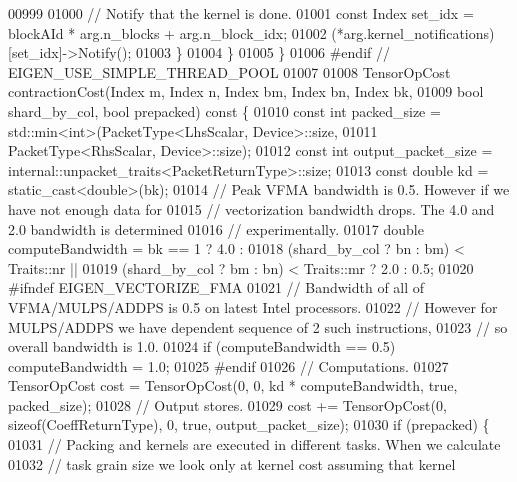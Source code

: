 \begin{DoxyCode}
{00999 
01000         \textcolor{comment}{// Notify that the kernel is done.}
01001         \textcolor{keyword}{const} Index set\_idx = blockAId * arg.n\_blocks + arg.n\_block\_idx;
01002         (*arg.kernel\_notifications)[set\_idx]->Notify();
01003       \}
01004     \}
01005   \}
01006 \textcolor{preprocessor}{#endif  // EIGEN\_USE\_SIMPLE\_THREAD\_POOL}
01007 
01008   TensorOpCost contractionCost(Index m, Index n, Index bm, Index bn, Index bk,
01009                                \textcolor{keywordtype}{bool} shard\_by\_col, \textcolor{keywordtype}{bool} prepacked)\textcolor{keyword}{ const }\{
01010     \textcolor{keyword}{const} \textcolor{keywordtype}{int} packed\_size = std::min<int>(PacketType<LhsScalar, Device>::size,
01011                                           PacketType<RhsScalar, Device>::size);
01012     \textcolor{keyword}{const} \textcolor{keywordtype}{int} output\_packet\_size = internal::unpacket\_traits<PacketReturnType>::size;
01013     \textcolor{keyword}{const} \textcolor{keywordtype}{double} kd = \textcolor{keyword}{static\_cast<}\textcolor{keywordtype}{double}\textcolor{keyword}{>}(bk);
01014     \textcolor{comment}{// Peak VFMA bandwidth is 0.5. However if we have not enough data for}
01015     \textcolor{comment}{// vectorization bandwidth drops. The 4.0 and 2.0 bandwidth is determined}
01016     \textcolor{comment}{// experimentally.}
01017     \textcolor{keywordtype}{double} computeBandwidth = bk == 1 ? 4.0 :
01018           (shard\_by\_col ? bn : bm) < Traits::nr ||
01019           (shard\_by\_col ? bm : bn) < Traits::mr ? 2.0 : 0.5;
01020 \textcolor{preprocessor}{#ifndef EIGEN\_VECTORIZE\_FMA}
01021     \textcolor{comment}{// Bandwidth of all of VFMA/MULPS/ADDPS is 0.5 on latest Intel processors.}
01022     \textcolor{comment}{// However for MULPS/ADDPS we have dependent sequence of 2 such instructions,}
01023     \textcolor{comment}{// so overall bandwidth is 1.0.}
01024     \textcolor{keywordflow}{if} (computeBandwidth == 0.5) computeBandwidth = 1.0;
01025 \textcolor{preprocessor}{#endif}
01026     \textcolor{comment}{// Computations.}
01027     TensorOpCost cost = TensorOpCost(0, 0, kd * computeBandwidth, \textcolor{keyword}{true}, packed\_size);
01028     \textcolor{comment}{// Output stores.}
01029     cost += TensorOpCost(0, \textcolor{keyword}{sizeof}(CoeffReturnType), 0, \textcolor{keyword}{true}, output\_packet\_size);
01030     \textcolor{keywordflow}{if} (prepacked) \{
01031       \textcolor{comment}{// Packing and kernels are executed in different tasks. When we calculate}
01032       \textcolor{comment}{// task grain size we look only at kernel cost assuming that kernel}
}
\end{DoxyCode}
